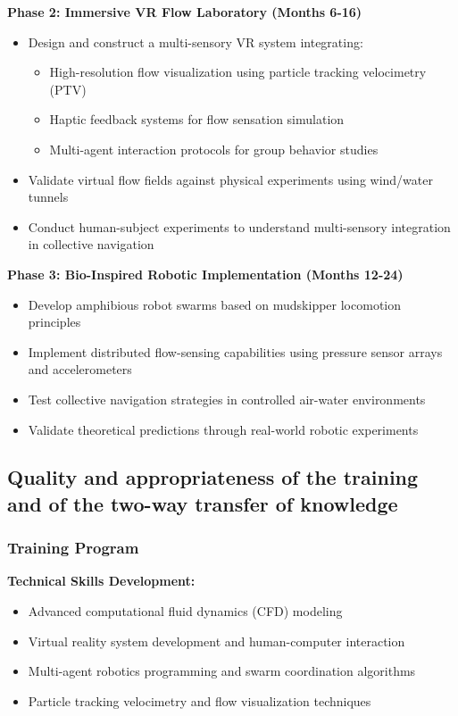 \documentclass[11pt,a4paper]{article}
\newcommand{\highlight}[1]{\textbf{\color{blue!70!black} #1}}
\begin{document}
\highlight{Phase 2: Immersive VR Flow Laboratory (Months 6-16)}
\begin{itemize}[noitemsep]
\item Design and construct a multi-sensory VR system integrating:
    \begin{itemize}
    \item High-resolution flow visualization using particle tracking velocimetry (PTV)
    \item Haptic feedback systems for flow sensation simulation
    \item Multi-agent interaction protocols for group behavior studies
    \end{itemize}
\item Validate virtual flow fields against physical experiments using wind/water tunnels
\item Conduct human-subject experiments to understand multi-sensory integration in collective navigation
\end{itemize}

\highlight{Phase 3: Bio-Inspired Robotic Implementation (Months 12-24)}
\begin{itemize}[noitemsep]
\item Develop amphibious robot swarms based on mudskipper locomotion principles
\item Implement distributed flow-sensing capabilities using pressure sensor arrays and accelerometers
\item Test collective navigation strategies in controlled air-water environments
\item Validate theoretical predictions through real-world robotic experiments
\end{itemize}

\subsection{Quality and appropriateness of the training and of the two-way transfer of knowledge}

\subsubsection{Training Program}

\highlight{Technical Skills Development:}
\begin{itemize}[noitemsep]
\item Advanced computational fluid dynamics (CFD) modeling
\item Virtual reality system development and human-computer interaction
\item Multi-agent robotics programming and swarm coordination algorithms
\item Particle tracking velocimetry and flow visualization techniques
\end{itemize}
\end{document}
